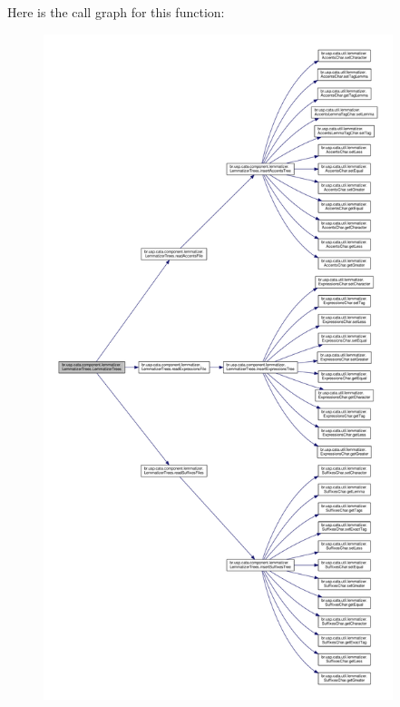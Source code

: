 Here is the call graph for this function\+:\nopagebreak
\begin{figure}[H]
\begin{center}
\leavevmode
\includegraphics[height=550pt]{classbr_1_1usp_1_1cata_1_1component_1_1lemmatizer_1_1_lemmatizer_trees_a02014a56727ee3b28a74e3375cdd27b9_cgraph}
\end{center}
\end{figure}




